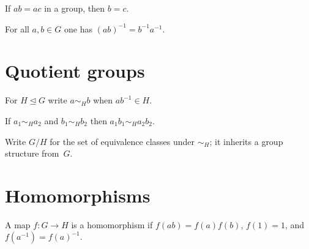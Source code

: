 \begin{lemma}\label{lem:left_cancel}
If $a b = a c$ in a group, then $b=c$.
\end{lemma}

\begin{lemma}\label{lem:inv_prod}
For all $a,b\in G$ one has $(a b)^{-1} = b^{-1} a^{-1}$.
\end{lemma}



\section{Quotient groups}

\begin{definition}\label{def:normeql}
For $H\trianglelefteq G$ write $a\sim_H b$ when $a b^{-1}\in H$.
\end{definition}

\begin{lemma}\label{lem:norm_mul}
If $a_1\sim_H a_2$ and $b_1\sim_H b_2$ then
$a_1 b_1\sim_H a_2 b_2$.
\end{lemma}

\begin{definition}\label{def:quotient_group}
Write $G/H$ for the set of equivalence classes
under $\sim_H$; it inherits a group structure from~$G$.
\end{definition}


\section{Homomorphisms}

\begin{definition}\label{def:grouphom}
A map $f\colon G\to H$ is a homomorphism if
$f(ab)=f(a)f(b)$, $f(1)=1$, and $f(a^{-1})=f(a)^{-1}$.
\end{definition}

